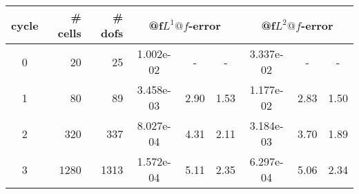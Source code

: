 \documentclass[10pt]{report}
\begin{document}
\begin{table}[H]
\begin{center}
\begin{tabular}{|c|r|r|c|c|c|c|c|c|} \hline
cycle & \# cells & \# dofs & 
\multicolumn{3}{|c|}{@f$L^1@f$-error} & 
\multicolumn{3}{|c|}{@f$L^2@f$-error}\\ \hline
0 & 20 & 25 & 1.002e-02 & - & - & 3.337e-02 & - & -\\ \hline
1 & 80 & 89 & 3.458e-03 & 2.90 & 1.53 & 1.177e-02 & 2.83 & 1.50\\ \hline
2 & 320 & 337 & 8.027e-04 & 4.31 & 2.11 & 3.184e-03 & 3.70 & 1.89\\ \hline
3 & 1280 & 1313 & 1.572e-04 & 5.11 & 2.35 & 6.297e-04 & 5.06 & 2.34\\ \hline
\end{tabular}
\end{center}
\end{table}
\end{document}
